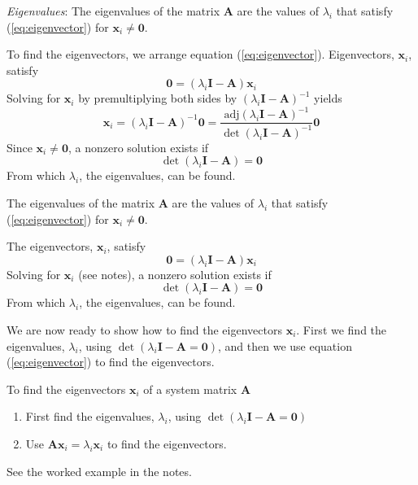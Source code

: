\emph{Eigenvalues}: The eigenvalues of the matrix $\mathbf{A}$ are the values of $\lambda_i$ that satisfy (\ref{eq:eigenvector}) for $\mathbf{x}_i\ne \mathbf{0}$.

To find the eigenvectors, we arrange equation (\ref{eq:eigenvector}). Eigenvectors, $\mathbf{x}_i$, satisfy
\begin{equation}\label{eq:581}
	\mathbf{0}=(\lambda_i\mathbf{I}-\mathbf{A})\mathbf{x}_i 
\end{equation}
Solving for $\mathbf{x}_i$ by premultiplying both sides by $(\lambda_i\mathbf{I}-\mathbf{A})^{-1}$ yields
\[
	\mathbf{x}_i = (\lambda_i\mathbf{I}-\mathbf{A})^{-1}\mathbf{0} = 
	       \frac{\textrm{adj}(\lambda_i\mathbf{I}-\mathbf{A})^{-1}}{\det(\lambda_i\mathbf{I}-\mathbf{A})^{-1}}\mathbf{0} 
\]
Since $\mathbf{x}_i\ne \mathbf{0}$, a nonzero solution exists if
\begin{equation}\label{eq:eigenvalue}
	\det(\lambda_i\mathbf{I}-\mathbf{A}) = \mathbf{0} \label{eq:eigenvalue}
\end{equation}
From which $\lambda_i$, the eigenvalues, can be found.
\ifslidesonly
\begin{slide}
The eigenvalues of the matrix $\mathbf{A}$ are the values of $\lambda_i$ that satisfy (\ref{eq:eigenvector}) for $\mathbf{x}_i\ne \mathbf{0}$.

The eigenvectors, $\mathbf{x}_i$, satisfy
\begin{equation}
	\mathbf{0}=(\lambda_i\mathbf{I}-\mathbf{A})\mathbf{x}_i \label{eq:581} 
\end{equation}
Solving for $\mathbf{x}_i$ (see notes), a nonzero solution exists if
\begin{equation}\label{eq:eigenvalue}
	\det(\lambda_i\mathbf{I}-\mathbf{A}) = \mathbf{0} \label{eq:eigenvalue}
\end{equation}   
From which $\lambda_i$, the eigenvalues, can be found.
\end{slide}
\fi

We are now ready to show how to find the eigenvectors $\mathbf{x}_i$. First we find the eigenvalues, $\lambda_i$, using $\det(\lambda_i\mathbf{I}-\mathbf{A} = \mathbf{0})$, and then we use equation (\ref{eq:eigenvector}) to find the eigenvectors.

\ifslidesonly
\begin{slide}
   To find the eigenvectors $\mathbf{x}_i$ of a system matrix $\mathbf{A}$
\begin{enumerate}
   	\item First find the eigenvalues, $\lambda_i$, using $\det(\lambda_i\mathbf{I}-\mathbf{A} = \mathbf{0})$
   	\item Use $\mathbf{A}\mathbf{x}_i=\lambda_i\mathbf{x}_i$ to find the eigenvectors.
   \end{enumerate}
   See the worked example in the notes.
\end{slide}
\fi

